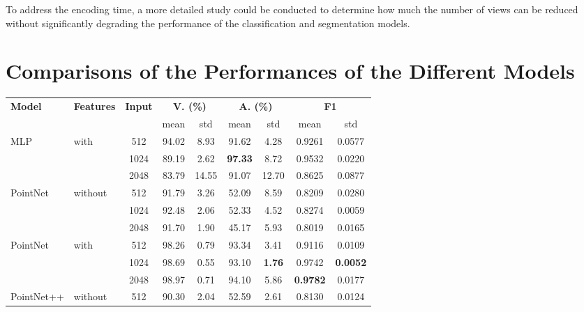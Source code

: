 \documentclass[%
 reprint,
 amsmath,amssymb,
 aps,
 floatfix,
 nofootinbib,
]{revtex4-2}
\begin{document}
To address the encoding time, a more detailed study could be conducted to determine how much the number of views can be reduced without significantly degrading the performance of the classification and segmentation models.

\onecolumngrid




\appendix

\clearpage
\section{Comparisons of the Performances of the Different Models}
\label{annexeA}

\begin{table}[h]
  \centering
  \begin{tabular}{llccccccc}
  \toprule
  \textbf{Model} & \textbf{Features} & \textbf{Input} 
  & \multicolumn{2}{c}{\textbf{V. (\%)}} 
  & \multicolumn{2}{c}{\textbf{A. (\%)}} 
  & \multicolumn{2}{c}{\textbf{F1}} \\
  \cmidrule(lr){4-5} \cmidrule(lr){6-7} \cmidrule(lr){8-9}
  & & & mean & std & mean & std & mean & std \\
  \midrule
  \multirow{3}{*}{MLP} & \multirow{3}{*}{with}
  & 512 & 94.02 & 8.93 & 91.62 & 4.28 & 0.9261 & 0.0577 \\
  &  & 1024 & 89.19 & 2.62 & \textbf{97.33} & 8.72 & 0.9532 & 0.0220 \\
  &  & 2048 & 83.79 & 14.55 & 91.07 & 12.70 & 0.8625 & 0.0877 \\ 
  \midrule
  \multirow{3}{*}{PointNet \citep{pointnet}} & \multirow{3}{*}{without}
  & 512 & 91.79 & 3.26 & 52.09 & 8.59 & 0.8209 & 0.0280 \\
  &  & 1024 & 92.48 & 2.06 & 52.33 & 4.52 & 0.8274 & 0.0059 \\
  &  & 2048 & 91.70 & 1.90 & 45.17 & 5.93 & 0.8019 & 0.0165 \\
  \midrule
  \multirow{3}{*}{PointNet \citep{pointnet}} & \multirow{3}{*}{with}
  & 512 & 98.26 & 0.79 & 93.34 & 3.41 & 0.9116 & 0.0109 \\
  &  & 1024 & 98.69 & 0.55 & 93.10 & \textbf{1.76} & 0.9742 & \textbf{0.0052} \\
  &  & 2048 & 98.97 & 0.71 & 94.10 & 5.86 & \textbf{0.9782} & 0.0177\\
  \midrule
  \multirow{3}{*}{PointNet++ \citep{pointnetpp}} & \multirow{3}{*}{without}
  & 512 & 90.30 & 2.04 & 52.59 & 2.61 & 0.8130 & 0.0124\\

\end{tabular}
\end{table}
\end{document}
